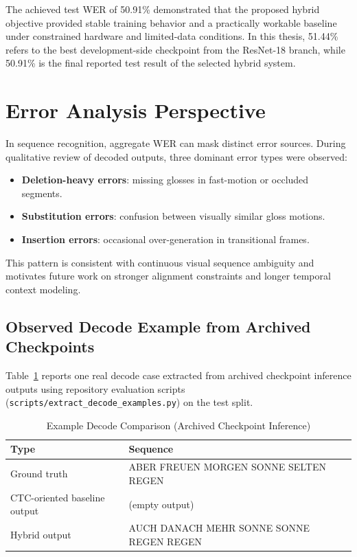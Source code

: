 The achieved test WER of 50.91\% demonstrated that the proposed hybrid objective provided stable training behavior and a practically workable baseline under constrained hardware and limited-data conditions. In this thesis, 51.44\% refers to the best development-side checkpoint from the ResNet-18 branch, while 50.91\% is the final reported test result of the selected hybrid system.

\section{Error Analysis Perspective}

In sequence recognition, aggregate WER can mask distinct error sources. During qualitative review of decoded outputs, three dominant error types were observed:
\begin{itemize}
    \item \textbf{Deletion-heavy errors}: missing glosses in fast-motion or occluded segments.
    \item \textbf{Substitution errors}: confusion between visually similar gloss motions.
    \item \textbf{Insertion errors}: occasional over-generation in transitional frames.
\end{itemize}

This pattern is consistent with continuous visual sequence ambiguity and motivates future work on stronger alignment constraints and longer temporal context modeling.

\subsection{Observed Decode Example from Archived Checkpoints}

Table~\ref{tab:real_decode_example} reports one real decode case extracted from archived checkpoint inference outputs using repository evaluation scripts (\texttt{scripts/extract\_decode\_examples.py}) on the test split.

\begin{table}[H]
\centering
\caption{Example Decode Comparison (Archived Checkpoint Inference)}
\label{tab:real_decode_example}
\begingroup
\small
\setlength{\tabcolsep}{4pt}
\begin{tabularx}{\textwidth}{@{}p{3.4cm}X@{}}
\toprule
\textbf{Type} & \textbf{Sequence} \\
\midrule
Ground truth & ABER FREUEN MORGEN SONNE SELTEN REGEN \\
CTC-oriented baseline output & (empty output) \\
Hybrid output & AUCH DANACH MEHR SONNE SONNE REGEN REGEN \\
\bottomrule
\end{tabularx}
\endgroup
\end{table}

